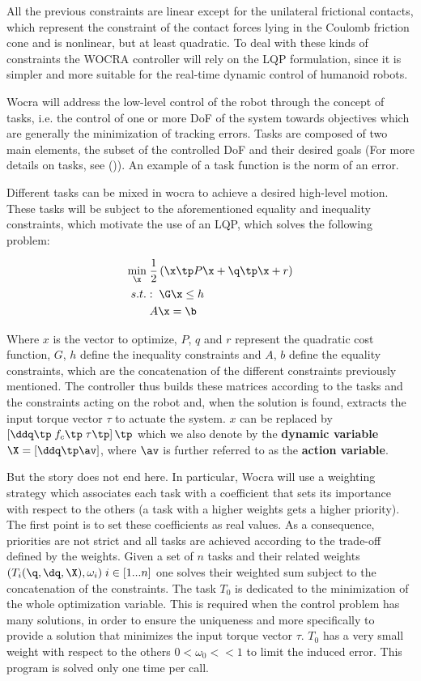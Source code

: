 All the previous constraints are linear except for the unilateral frictional contacts, which represent the constraint of the contact forces lying in the Coulomb friction cone and is nonlinear, but at least quadratic. To deal with these kinds of constraints the W\+O\+C\+RA controller will rely on the L\+QP formulation, since it is simpler and more suitable for the real-\/time dynamic control of humanoid robots.

Wocra will address the low-\/level control of the robot through the concept of tasks, i.\+e. the control of one or more DoF of the system towards objectives which are generally the minimization of tracking errors. Tasks are composed of two main elements, the subset of the controlled DoF and their desired goals (For more details on tasks, see ()). An example of a task function is the norm of an error.

Different tasks can be mixed in wocra to achieve a desired high-\/level motion. These tasks will be subject to the aforementioned equality and inequality constraints, which motivate the use of an L\+QP, which solves the following problem\+:

\begin{align*} \underset{\x}{\text{min}} &\; \frac{1}{2} \left( \x\tp P \x + \q\tp\x + r \right) \\ s.t. &:\; \G\x \leq h \\ &\; A\x = \b \end{align*}

Where $ x $ is the vector to optimize, $ P $, $ q $ and $ r $ represent the quadratic cost function, $ G $, $ h $ define the inequality constraints and $ A $, $ b $ define the equality constraints, which are the concatenation of the different constraints previously mentioned. The controller thus builds these matrices according to the tasks and the constraints acting on the robot and, when the solution is found, extracts the input torque vector $ \tau $ to actuate the system. $ x $ can be replaced by $ \left[ \ddq \tp \; f_c \tp \; \tau \tp \right] \tp $ which we also denote by the {\bfseries dynamic variable} $ \X = [\ddq\tp \av] $, where $ \av $ is further referred to as the {\bfseries action variable}.

But the story does not end here. In particular, Wocra will use a weighting strategy which associates each task with a coefficient that sets its importance with respect to the others (a task with a higher weights gets a higher priority). The first point is to set these coefficients as real values. As a consequence, priorities are not strict and all tasks are achieved according to the trade-\/off defined by the weights. Given a set of $ n $ tasks and their related weights $ (T_i(\q, \dq, \X), \omega_i) \; i \in [1...n] $ one solves their weighted sum subject to the concatenation of the constraints. The task $ T_0 $ is dedicated to the minimization of the whole optimization variable. This is required when the control problem has many solutions, in order to ensure the uniqueness and more specifically to provide a solution that minimizes the input torque vector $ \tau $. $ T_0 $ has a very small weight with respect to the others $ 0 < \omega_0 << 1 $ to limit the induced error. This program is solved only one time per call.

